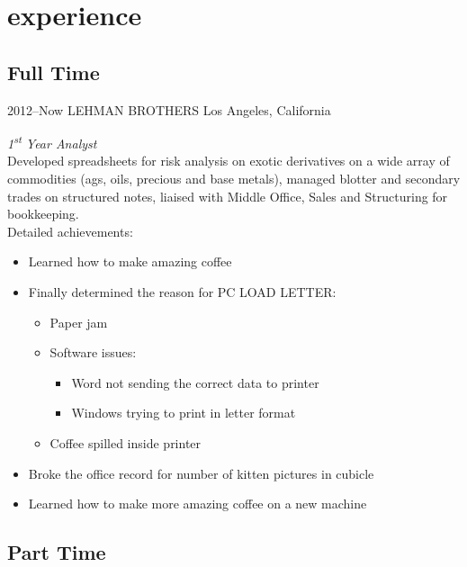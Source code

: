 \documentclass[a4paper]{cv-friggeri-x}
\begin{document}
\section{experience}

\subsection{Full Time}

\begin{entrylist}


\entry
{2012--Now}
{LEHMAN BROTHERS}
{Los Angeles, California}
{\emph{1\textsuperscript{st} Year Analyst} \\
Developed spreadsheets for risk analysis on exotic derivatives on a wide array of commodities (ags, oils, precious and base metals), managed blotter and secondary trades on structured notes, liaised with Middle Office, Sales and Structuring for bookkeeping. \\
Detailed achievements:
\begin{itemize}
\item Learned how to make amazing coffee
\item Finally determined the reason for \textsc{PC LOAD LETTER}:
\begin{itemize}
\item Paper jam
\item Software issues:
\begin{itemize}
\item Word not sending the correct data to printer
\item Windows trying to print in letter format
\end{itemize}
\item Coffee spilled inside printer
\end{itemize}
\item Broke the office record for number of kitten pictures in cubicle
\item Learned how to make more amazing coffee on a new machine
\end{itemize}}


\end{entrylist}

\subsection{Part Time}
\end{document}
